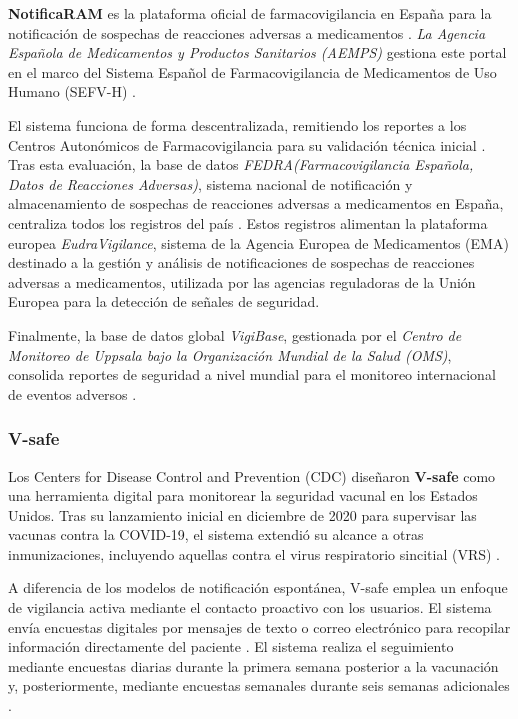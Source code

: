 \textbf{NotificaRAM} es la plataforma oficial de farmacovigilancia en España para la notificación de sospechas de reacciones adversas a medicamentos \cite{aemps_manual_2025}.
\textit{La Agencia Española de Medicamentos y Productos Sanitarios (AEMPS)} gestiona este portal en el marco del Sistema Español de Farmacovigilancia de Medicamentos de Uso Humano (SEFV-H) \cite{aemps_sefv_2025}.

El sistema funciona de forma descentralizada, remitiendo los reportes a los Centros Autonómicos de Farmacovigilancia para su validación técnica inicial \cite{aemps_manual_2025}. 
Tras esta evaluación, la base de datos \textit{FEDRA(Farmacovigilancia Española, Datos de Reacciones Adversas)}, sistema nacional de notificación y almacenamiento de sospechas de reacciones adversas a medicamentos en España, centraliza todos los registros del país \cite{aemps_fedra_2026}.
Estos registros alimentan la plataforma europea \textit{EudraVigilance}, sistema de la Agencia Europea de Medicamentos (EMA) destinado a la gestión y análisis de notificaciones de sospechas de reacciones adversas a medicamentos, utilizada por las agencias reguladoras de la Unión Europea para la detección de señales de seguridad.

Finalmente, la base de datos global \textit{VigiBase}, gestionada por el \textit{Centro de Monitoreo de Uppsala bajo la Organización Mundial de la Salud (OMS)}, consolida reportes de seguridad a nivel mundial para el monitoreo internacional de eventos adversos \cite{aemps_notificacion_2026}.


\subsubsection{V-safe}


Los Centers for Disease Control and Prevention (CDC) diseñaron \textbf{V-safe} como una herramienta digital para monitorear la seguridad vacunal en los Estados Unidos.
Tras su lanzamiento inicial en diciembre de 2020 para supervisar las vacunas contra la COVID-19, el sistema extendió su alcance a otras inmunizaciones, incluyendo aquellas contra el virus respiratorio sincitial (VRS) \cite{cdc_vsafe_portal}.

A diferencia de los modelos de notificación espontánea, V-safe emplea un enfoque de vigilancia activa mediante el contacto proactivo con los usuarios. 
El sistema envía encuestas digitales por mensajes de texto o correo electrónico para recopilar información directamente del paciente \cite{cdc_about_vsafe}.
El sistema realiza el seguimiento mediante encuestas diarias durante la primera semana posterior a la vacunación y, posteriormente, mediante encuestas semanales durante seis semanas adicionales \cite{cdc_vsafe_portal,vsafe_monitoring_article}.

